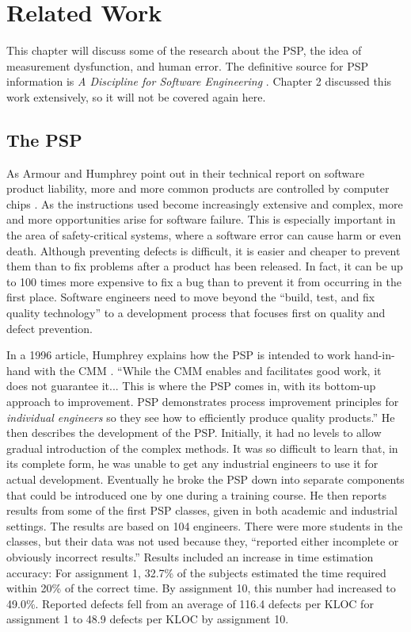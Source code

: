 \chapter{Related Work}

This chapter will discuss some of the research about the PSP, the idea of
measurement dysfunction, and human error.  The definitive source for PSP
information is {\it A Discipline for Software Engineering}
\cite{Humphrey95}.  Chapter 2 discussed this work extensively, so it will
not be covered again here.

\section{The PSP}

As Armour and Humphrey point out in their technical report on software
product liability, more and more common products are controlled by computer
chips \cite{Armour93}. As the instructions used become increasingly
extensive and complex, more and more opportunities arise for software
failure.  This is especially important in the area of safety-critical
systems, where a software error can cause harm or even death. Although
preventing defects is difficult, it is easier and cheaper to prevent them
than to fix problems after a product has been released.  In fact, it can be
up to 100 times more expensive to fix a bug than to prevent it from
occurring in the first place.  Software engineers need to move beyond the
``build, test, and fix quality technology'' to a development process that
focuses first on quality and defect prevention.

In a 1996 article, Humphrey explains how the PSP is intended to work
hand-in-hand with the CMM \cite{Humphrey96}. ``While the CMM enables and
facilitates good work, it does not guarantee it... This is where the PSP
comes in, with its bottom-up approach to improvement.  PSP demonstrates
process improvement principles for {\it individual engineers} so they see
how to efficiently produce quality products.''  He then describes the
development of the PSP.  Initially, it had no levels to allow gradual
introduction of the complex methods. It was so difficult to learn that, in
its complete form, he was unable to get any industrial engineers to use it
for actual development.  Eventually he broke the PSP down into separate
components that could be introduced one by one during a training course.
He then reports results from some of the first PSP classes, given in both
academic and industrial settings.  The results are based on 104 engineers.
There were more students in the classes, but their data was not used
because they, ``reported either incomplete or obviously incorrect
results.'' Results included an increase in time estimation accuracy:  For
assignment 1, 32.7\% of the subjects estimated the time required within
20\% of the correct time.  By assignment 10, this number had increased to
49.0\%.  Reported defects fell from an average of 116.4 defects per KLOC
for assignment 1 to 48.9 defects per KLOC by assignment 10.

